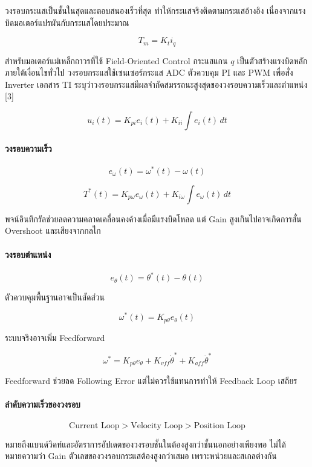 วงรอบกระแสเป็นชั้นในสุดและตอบสนองเร็วที่สุด ทำให้กระแสจริงติดตามกระแสอ้างอิง เนื่องจากแรงบิดมอเตอร์แปรผันกับกระแสโดยประมาณ

\[
T_m=K_t i_q
\]

สำหรับมอเตอร์แม่เหล็กถาวรที่ใช้ Field-Oriented Control กระแสแกน $q$ เป็นตัวสร้างแรงบิดหลักภายใต้เงื่อนไขทั่วไป วงรอบกระแสใช้เซนเซอร์กระแส ADC ตัวควบคุม PI และ PWM เพื่อสั่ง Inverter เอกสาร TI ระบุว่าวงรอบกระแสมีผลจำกัดสมรรถนะสูงสุดของวงรอบความเร็วและตำแหน่ง [3]

\[
u_i(t)=K_{pi}e_i(t)+K_{ii}\int e_i(t)\,dt
\]

\paragraph{วงรอบความเร็ว}

\[
e_\omega(t)=\omega^\ast(t)-\omega(t)
\]

\[
T^\ast(t)=K_{p\omega}e_\omega(t)
+K_{i\omega}\int e_\omega(t)\,dt
\]

พจน์อินทิกรัลช่วยลดความคลาดเคลื่อนคงค้างเมื่อมีแรงบิดโหลด แต่ Gain สูงเกินไปอาจเกิดการสั่น Overshoot และเสียงจากกลไก

\paragraph{วงรอบตำแหน่ง}

\[
e_\theta(t)=\theta^\ast(t)-\theta(t)
\]

ตัวควบคุมพื้นฐานอาจเป็นสัดส่วน

\[
\omega^\ast(t)=K_{p\theta}e_\theta(t)
\]

ระบบจริงอาจเพิ่ม Feedforward

\[
\omega^\ast
=
K_{p\theta}e_\theta
+
K_{vff}\dot{\theta}^\ast
+
K_{aff}\ddot{\theta}^\ast
\]

Feedforward ช่วยลด Following Error แต่ไม่ควรใช้แทนการทำให้ Feedback Loop เสถียร

\paragraph{ลำดับความเร็วของวงรอบ}

\[
\text{Current Loop}
>
\text{Velocity Loop}
>
\text{Position Loop}
\]

หมายถึงแบนด์วิดท์และอัตราการอัปเดตของวงรอบชั้นในต้องสูงกว่าชั้นนอกอย่างเพียงพอ ไม่ได้หมายความว่า Gain ตัวเลขของวงรอบกระแสต้องสูงกว่าเสมอ เพราะหน่วยและสเกลต่างกัน

